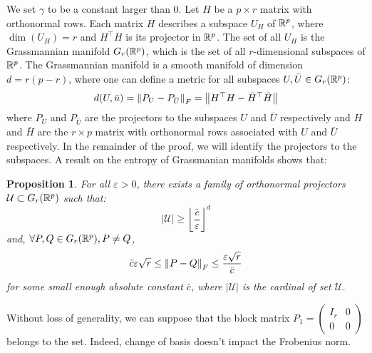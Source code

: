\documentclass{article}
\numberwithin{equation}{section}
\newtheorem{proposition}{Proposition}
\numberwithin{equation}{section}
\begin{document}
            We set $\gamma$ to be a constant larger than $0$. Let $H$ be a $p\times r$ matrix with orthonormal rows. Each matrix $H$ describes a subspace $U_H$ of $\mathbb{R}^p$, where $\dim(U_H) = r$ and $H^\top H$ is its projector in $\mathbb{R}^p$. The set of all $U_H$ is the Grassmannian manifold $G_r(\mathbb{R}^p)$, which is the set of all $r$-dimensional subspaces of $\mathbb{R}^p$. The Grassmannian manifold is a smooth manifold of dimension $d = r(p-r)$, where one can define a metric for all subspaces $U, \bar{U} \in G_r(\mathbb{R}^p)$:
            \begin{equation}
                d(U,\bar{u}) = \left\Vert P_U - P_{\bar{U}} \right\Vert_F = \left\Vert H^\top H - \bar{H}^\top \bar{H} \right\Vert
            \end{equation}
            where $P_U$ and $P_{\bar{U}}$ are the projectors to the subspaces $U$ and $\bar{U}$ respectively and $H$ and $\bar{H}$ are the $r\times p$ matrix with orthonormal rows associated with $U$ and $\bar{U}$ respectively. In the remainder of the proof, we will identify the projectors to the subspaces. A result on the entropy of Grassmanian manifolds \citep{pajorMetricEntropyGrassmann1998} shows that:
            
            \begin{proposition}
            \label{prop:entropy}
                For all $\varepsilon > 0$, there exists a family of orthonormal projectors $\mathcal{U} \subset G_r(\mathbb{R}^p)$ such that:
                \begin{equation}
                    \vert \mathcal{U} \vert \geq \left\lfloor \frac{\bar{c}}{\varepsilon}\right\rfloor^d
                \end{equation}
                and, $\forall P,Q \in G_r(\mathbb{R}^p), P \neq Q$,
                \begin{equation}
                    \bar{c} \varepsilon \sqrt{r} \leq \left\Vert P - Q \right\Vert_F \leq \frac{\varepsilon \sqrt{r}}{\bar{c}}
                \end{equation}
                for some small enough absolute constant $\bar{c}$, where $\vert\mathcal{U}\vert$ is the cardinal of set $\mathcal{U}$.
            \end{proposition}
            Without loss of generality, we can suppose that the block matrix $P_1 = \begin{pmatrix}I_r & 0 \\ 0 & 0\end{pmatrix}$ belongs to the set. Indeed, change of basis doesn't impact the Frobenius norm.
            
\end{document}
